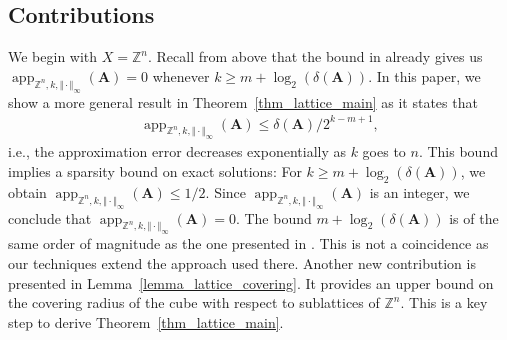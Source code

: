 \documentclass[pdflatex]{sn-jnl}
\DeclareMathOperator{\app}{app}
\newcommand{\Z}{\mathbb{Z}}
\newcommand{\bA}{\bm{A}}
\theoremstyle{thmstyleone}%
\theoremstyle{thmstyletwo}%
\theoremstyle{thmstylethree}%
\begin{document}
	\subsection{Contributions}
	We begin with $X=\Z^n$. Recall from above that the bound in \cite[Theorem 1]{alievAverkovLoeraOertel21} already gives us $\app_{\Z^n,k,\Vert\cdot\Vert_\infty}(\bA) = 0$ whenever $k \geq m + \log_2(\delta(\bA))$. 
	In this paper, we show a more general result in Theorem~\ref{thm_lattice_main} as it states that 
	\begin{align*}
		\app_{\Z^n,k,\Vert\cdot\Vert_\infty}(\bA) \leq \delta(\bA)/2^{k-m+1},
	\end{align*}
	i.e., the approximation error decreases exponentially as $k$ goes to $n$. 
	This bound implies a sparsity bound on exact solutions: For $k \geq m + \log_2(\delta(\bA))$, we obtain $\app_{\Z^n,k,\Vert\cdot\Vert_\infty}(\bA)  \leq  1/2$. Since $\app_{\Z^n,k,\Vert\cdot\Vert_\infty}(\bA)$ is an integer, we conclude that $\app_{\Z^n,k,\Vert\cdot\Vert_\infty}(\bA)  = 0$. The bound $ m + \log_2(\delta(\bA))$ is of the same order of magnitude as the one presented in \cite[Theorem 1]{alievAverkovLoeraOertel21}. This is not a coincidence as our techniques extend the approach used there. Another new contribution is presented in Lemma~\ref{lemma_lattice_covering}. It provides an upper bound on the covering radius of the cube with respect to sublattices of $\Z^n$. This is a key step to derive Theorem~\ref{thm_lattice_main}.
	
\end{document}
